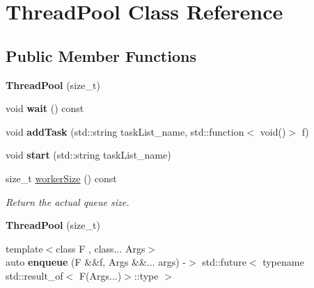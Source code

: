 \hypertarget{classThreadPool}{}\section{Thread\+Pool Class Reference}
\label{classThreadPool}
\subsection*{Public Member Functions}
\begin{DoxyCompactItemize}
\item 
\mbox{\label{classThreadPool_ac291710e33dbbed96ee20711080d506d}} 
{\bfseries Thread\+Pool} (size\+\_\+t)
\item 
\mbox{\label{classThreadPool_a8bc38c40ecf3916d28e1e721b4eaa3ac}} 
void {\bfseries wait} () const
\item 
\mbox{\label{classThreadPool_af6a320632c1109c92cffafa6098cdaf2}} 
void {\bfseries add\+Task} (std\+::string task\+List\+\_\+name, std\+::function$<$ void()$>$ f)
\item 
\mbox{\label{classThreadPool_a703b053c68ddb205a1c8c74539750bfe}} 
void {\bfseries start} (std\+::string task\+List\+\_\+name)
\item 
\mbox{\label{classThreadPool_acedf753fca0af3a8d23cea609273183c}} 
size\+\_\+t \hyperlink{classThreadPool_acedf753fca0af3a8d23cea609273183c}{worker\+Size} () const
\begin{DoxyCompactList}\small\item\em Return the actual queue size. \end{DoxyCompactList}\item 
\mbox{\label{classThreadPool_ac291710e33dbbed96ee20711080d506d}} 
{\bfseries Thread\+Pool} (size\+\_\+t)
\item 
\mbox{\label{classThreadPool_a8f628893c030552d9714c25f68656adc}} 
{\footnotesize template$<$class F , class... Args$>$ }\\auto {\bfseries enqueue} (F \&\&f, Args \&\&... args) -\/$>$ std\+::future$<$ typename std\+::result\+\_\+of$<$ F(Args...)$>$\+::type $>$
\item 

\end{DoxyCompactItemize}
